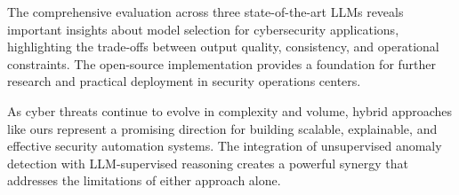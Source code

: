 \documentclass[11pt,twocolumn]{article}
\begin{document}
The comprehensive evaluation across three state-of-the-art LLMs reveals important insights about model selection for cybersecurity applications, highlighting the trade-offs between output quality, consistency, and operational constraints. The open-source implementation provides a foundation for further research and practical deployment in security operations centers.

As cyber threats continue to evolve in complexity and volume, hybrid approaches like ours represent a promising direction for building scalable, explainable, and effective security automation systems. The integration of unsupervised anomaly detection with LLM-supervised reasoning creates a powerful synergy that addresses the limitations of either approach alone.
\end{document}
